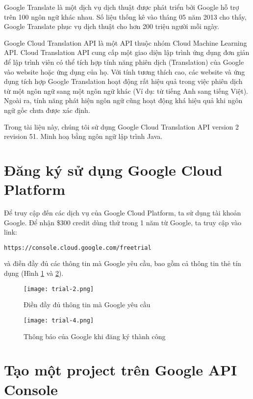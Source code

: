 \documentclass[../thesis.tex]{subfiles}
\begin{document}
Google Translate là một dịch vụ dịch thuật được phát triển bởi Google hỗ trợ trên 100 ngôn ngữ khác nhau. Số liệu thống kê vào tháng 05 năm 2013 cho thấy, Google Translate phục vụ dịch thuật cho hơn 200 triệu người mỗi ngày.

Google Cloud Translation API là một API thuộc nhóm Cloud Machine Learning API. Cloud Translation API cung cấp một giao diện lập trình ứng dụng đơn giản để lập trình viên có thể tích hợp tính năng phiên dịch (Translation) của Google vào website hoặc ứng dụng của họ. Với tính tương thích cao, các website và ứng dụng tích hợp Google Translation hoạt động rất hiệu quả trong việc phiên dịch từ một ngôn ngữ sang một ngôn ngữ khác (Ví dụ: từ tiếng Anh sang tiếng Việt). Ngoài ra, tính năng phát hiện ngôn ngữ cũng hoạt động khá hiệu quả khi ngôn ngữ gốc chưa được xác định.

Trong tài liệu này, chúng tôi sử dụng Google Cloud Translation API version 2 revision 51. Minh hoạ bằng ngôn ngữ lập trình Java. 

\section{Đăng ký sử dụng Google Cloud Platform}

Để truy cập đến các dịch vụ của Google Cloud Platform, ta sử dụng tài khoản Google. Để nhận \$300 credit dùng thử trong 1 năm từ Google, ta truy cập vào link:
\begin{lstlisting}[numbers=none, frame=single,xleftmargin=0.15cm,xrightmargin=0.15cm]
https://console.cloud.google.com/freetrial
\end{lstlisting}
và điền đầy đủ các thông tin mà Google yêu cầu, bao gồm cả thông tin thẻ tín dụng (Hình \ref{Dien day du thong tin ma Google yeu cau} và \ref{Thong bao cua Google khi dang ky thanh cong}).

\begin{figure}
	\texttt{[image: trial-2.png]}
	\caption{Điền đầy đủ thông tin mà Google yêu cầu}
	\label{Dien day du thong tin ma Google yeu cau}
\end{figure}

\begin{figure}
	\texttt{[image: trial-4.png]}
	\caption{Thông báo của Google khi đăng ký thành công}
	\label{Thong bao cua Google khi dang ky thanh cong}
\end{figure}

\section{Tạo một project trên Google API Console}
\end{document}
